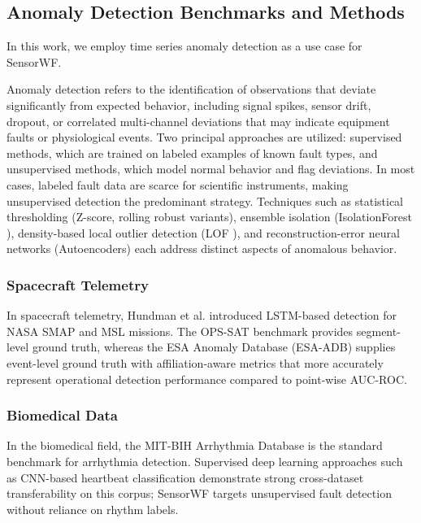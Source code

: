\documentclass[conference]{IEEEtran}
\newcommand\Logan[1]{\leavevmode{\footnotesize\textbf{[Logan: #1]}}}
\begin{document}
\subsection{Anomaly Detection Benchmarks and Methods}

In this work, we employ time series anomaly detection as a use case for SensorWF. 

Anomaly detection refers to the identification of observations that deviate significantly from expected behavior, including signal spikes, sensor drift, dropout, or correlated multi-channel deviations that may indicate equipment faults or physiological events. Two principal approaches are utilized: supervised methods, which are trained on labeled examples of known fault types, and unsupervised methods, which model normal behavior and flag deviations. In most cases, labeled fault data are scarce for scientific instruments, making unsupervised detection the predominant strategy. Techniques such as statistical thresholding (Z-score, rolling robust variants), ensemble isolation (IsolationForest \cite{liu2008isolation}), density-based local outlier detection (LOF \cite{breunig2000lof}), and reconstruction-error neural networks (Autoencoders) each address distinct aspects of anomalous behavior.

\subsubsection{Spacecraft Telemetry}
In spacecraft telemetry, Hundman et al. \cite{hundman2018detecting} introduced LSTM-based detection for NASA SMAP and MSL missions. The OPS-SAT benchmark \cite{ruszczak2025opssat} provides segment-level ground truth, whereas the ESA Anomaly Database (ESA-ADB) \cite{esa_adb2024} supplies event-level ground truth with affiliation-aware metrics that more accurately represent operational detection performance compared to point-wise AUC-ROC. 

\subsubsection{Biomedical Data}

In the biomedical field, the MIT-BIH Arrhythmia Database \cite{moody2001mitbih} is the standard benchmark for arrhythmia detection. Supervised deep learning approaches such as CNN-based heartbeat classification \cite{kachuee2018ecgclass} demonstrate strong cross-dataset transferability on this corpus; SensorWF targets unsupervised fault detection without reliance on rhythm labels. \Logan{Expand}
\end{document}
